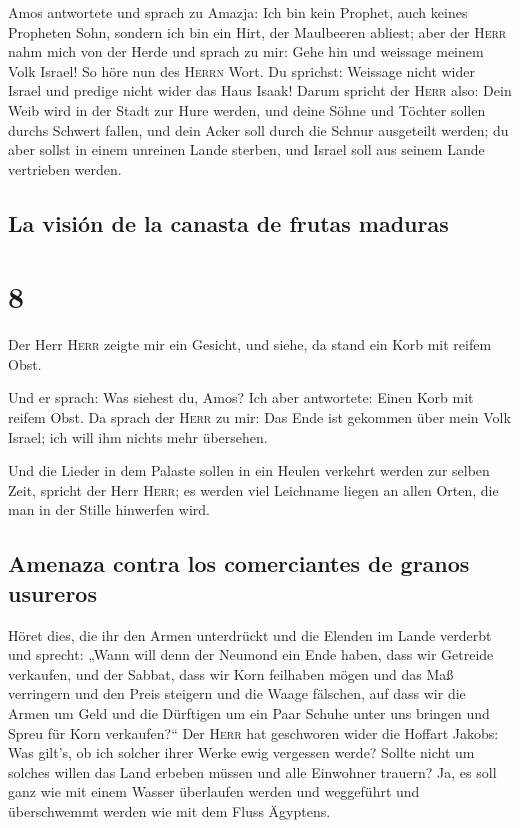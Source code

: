  Amos antwortete und sprach zu Amazja: Ich bin kein
Prophet, auch keines Propheten Sohn, sondern ich bin ein Hirt, der
Maulbeeren abliest;  aber der \textsc{Herr} nahm mich von
der Herde und sprach zu mir: Gehe hin und weissage meinem Volk Israel!
 So höre nun des \textsc{Herrn} Wort. Du sprichst:
Weissage nicht wider Israel und predige nicht wider das Haus Isaak!
 Darum spricht der \textsc{Herr} also: Dein Weib wird in
der Stadt zur Hure werden, und deine Söhne und Töchter sollen durchs
Schwert fallen, und dein Acker soll durch die Schnur ausgeteilt werden;
du aber sollst in einem unreinen Lande sterben, und Israel soll aus
seinem Lande vertrieben werden.

\hypertarget{la-visiuxf3n-de-la-canasta-de-frutas-maduras}{%
\subsection{La visión de la canasta de frutas
maduras}\label{la-visiuxf3n-de-la-canasta-de-frutas-maduras}}

\hypertarget{section-7}{%
\section{8}\label{section-7}}

 Der Herr \textsc{Herr} zeigte mir ein Gesicht, und siehe,
da stand ein Korb mit reifem Obst.

 Und er sprach: Was siehest du, Amos? Ich aber antwortete:
Einen Korb mit reifem Obst. Da sprach der \textsc{Herr} zu mir: Das Ende
ist gekommen über mein Volk Israel; ich will ihm nichts mehr übersehen.

 Und die Lieder in dem Palaste sollen in ein Heulen
verkehrt werden zur selben Zeit, spricht der Herr \textsc{Herr}; es
werden viel Leichname liegen an allen Orten, die man in der Stille
hinwerfen wird.

\hypertarget{amenaza-contra-los-comerciantes-de-granos-usureros}{%
\subsection{Amenaza contra los comerciantes de granos
usureros}\label{amenaza-contra-los-comerciantes-de-granos-usureros}}

 Höret dies, die ihr den Armen unterdrückt und die Elenden
im Lande verderbt  und sprecht: „Wann will denn der
Neumond ein Ende haben, dass wir Getreide verkaufen, und der Sabbat,
dass wir Korn feilhaben mögen und das Maß verringern und den Preis
steigern und die Waage fälschen,  auf dass wir die Armen
um Geld und die Dürftigen um ein Paar Schuhe unter uns bringen und Spreu
für Korn verkaufen?{}``  Der \textsc{Herr} hat geschworen
wider die Hoffart Jakobs: Was gilt's, ob ich solcher ihrer Werke ewig
vergessen werde?  Sollte nicht um solches willen das Land
erbeben müssen und alle Einwohner trauern? Ja, es soll ganz wie mit
einem Wasser überlaufen werden und weggeführt und überschwemmt werden
wie mit dem Fluss Ägyptens.

